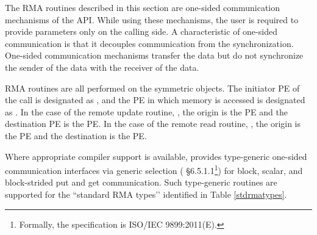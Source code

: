 The \ac{RMA} routines described in this section are one-sided communication
mechanisms of the \openshmem{} \ac{API}. While using these mechanisms, the user
is required to provide parameters only on the calling side. A characteristic of
one-sided communication is that it decouples communication from the
synchronization. One-sided communication mechanisms transfer the data but do not
synchronize the sender of the data with the receiver of the data. 

\openshmem{} \ac{RMA} routines are all performed on the symmetric objects.  The
initiator \ac{PE} of the call is designated as \source{}, and the \ac{PE} in
which memory is accessed is designated as \dest{}. In the case of the remote
update routine, \PUT{}, the origin is the \source{} \ac{PE} and the destination
\ac{PE} is the \dest{} PE. In the case of the remote read routine, \GET{}, the
origin is the \dest{} \ac{PE} and the destination is the \source{} \ac{PE}.

Where appropriate compiler support is available, \openshmem{} provides type-generic 
one-sided communication interfaces via \Celev{} generic selection 
(\Celev{} \S6.5.1.1\footnote{Formally, the \Celev{} specification is ISO/IEC 9899:2011(E).})
for block, scalar, and block-strided put and get communication. 
Such type-generic routines are supported for the
 ``standard \ac{RMA} types’’
identified in Table \ref{stdrmatypes}.

